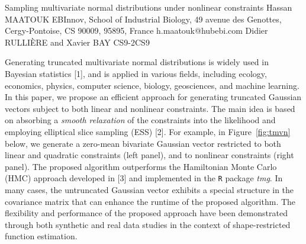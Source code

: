 \begin{talk}
  {Sampling multivariate normal distributions under nonlinear constraints}%
  {Hassan MAATOUK}%
  {EBInnov, School of Industrial Biology, 49 avenue des Genottes,
Cergy-Pontoise, CS 90009, 95895, France}%
  {h.maatouk@hubebi.com}%
  {Didier RULLI\`ERE and Xavier BAY}%
{}{}{CS9-2}{CS9}

			

Generating truncated multivariate normal distributions is widely used in Bayesian statistics [1],  
and is applied in various fields, including ecology, economics, physics, computer science, biology, geosciences, and machine learning.
In this paper, we propose an efficient approach for generating truncated Gaussian vectors subject to both linear and nonlinear constraints.
The main idea is based on absorbing a \textit{smooth relaxation} of the constraints into the likelihood and employing elliptical slice sampling (ESS) [2]. 
For example, in Figure~\ref{fig:tmvn} below, we generate a zero-mean bivariate Gaussian vector restricted to both linear and quadratic constraints (left panel), and to nonlinear constraints (right panel). 
The proposed algorithm outperforms the Hamiltonian Monte Carlo (HMC) approach developed in [3] and implemented in the \texttt{R} package \textit{tmg}. In many cases, the untruncated Gaussian vector exhibits a special structure in the covariance matrix that can enhance the runtime of the proposed algorithm.
The flexibility and performance of the proposed approach have been demonstrated through both synthetic and real data studies in the context of shape-restricted function estimation.



\end{talk}
